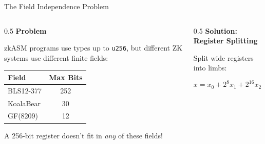 \documentclass[aspectratio=169,11pt]{beamer}
\begin{document}
\begin{frame}{The Field Independence Problem}

\begin{columns}
\begin{column}{0.5\textwidth}
\textbf{Problem}

zkASM programs use types up to \texttt{u256}, but different ZK systems use different finite fields:

\vspace{0.5em}
\begin{table}
\centering
\small
\begin{tabular}{lc}
\toprule
Field & Max Bits \\
\midrule
BLS12-377 & 252 \\
KoalaBear & 30 \\
GF(8209) & 12 \\
\bottomrule
\end{tabular}
\end{table}

\vspace{0.5em}
A 256-bit register doesn't fit in \textit{any} of these fields!
\end{column}

\begin{column}{0.5\textwidth}
\textbf{Solution: Register Splitting}

Split wide registers into limbs:

\begin{center}
\end{center}

\vspace{0.3em}
\[
x = x_0 + 2^8 x_1 + 2^{16} x_2 + 2^{24} x_3
\]
\end{column}
\end{columns}
\end{frame}
\end{document}
